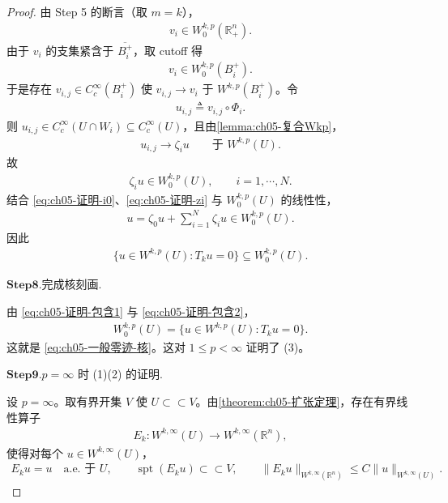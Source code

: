 \begin{proof}
由 Step 5 的断言（取 $m=k$），
\begin{align*}
v_{i}\in W^{k,p}_{0}(\mathbb{R}^{n}_{+}).
\end{align*}
由于 $v_{i}$ 的支集紧含于 $\overline{B_{i}^{+}}$，取 cutoff 得
\begin{align}
v_{i}\in W^{k,p}_{0}(B_{i}^{+}).
\label{eq:ch05-证明-vi}
\end{align}
于是存在 $v_{i,j}\in C^{\infty}_{c}(B_{i}^{+})$ 使 $v_{i,j}\to v_{i}$ 于 $W^{k,p}(B_{i}^{+})$。令
\begin{align*}
u_{i,j}\triangleq v_{i,j}\circ\Phi_{i}.
\end{align*}
则 $u_{i,j}\in C^{\infty}_{c}(U\cap W_{i})\subseteq C^{\infty}_{c}(U)$，且由\cref{lemma:ch05-复合Wkp}，
\begin{align*}
u_{i,j}\longrightarrow\zeta_{i}u
\qquad\text{于 }W^{k,p}(U).
\end{align*}
故
\begin{align}
\zeta_{i}u\in W^{k,p}_{0}(U),
\qquad i=1,\cdots,N.
\label{eq:ch05-证明-zi}
\end{align}
结合 \eqref{eq:ch05-证明-i0}、\eqref{eq:ch05-证明-zi} 与 $W^{k,p}_{0}(U)$ 的线性性，
\begin{align*}
u=\zeta_{0}u+\sum_{i=1}^{N}\zeta_{i}u\in W^{k,p}_{0}(U).
\end{align*}
因此
\begin{align}
\{u\in W^{k,p}(U):T_{k}u=0\}\subseteq W^{k,p}_{0}(U).
\label{eq:ch05-证明-包含2}
\end{align}

\noindent$\mathbf{Step}\mathbf{8}.${\heiti 完成核刻画.}

由 \eqref{eq:ch05-证明-包含1} 与 \eqref{eq:ch05-证明-包含2}，
\begin{align*}
W^{k,p}_{0}(U)=\{u\in W^{k,p}(U):T_{k}u=0\}.
\end{align*}
这就是 \eqref{eq:ch05-一般零迹-核}。这对 $1\leqslant p<\infty$ 证明了 (3)。

\noindent$\mathbf{Step}\mathbf{9}.${\heiti $p=\infty$ 时 (1)(2) 的证明.}

设 $p=\infty$。取有界开集 $V$ 使 $U\subset\subset V$。由\cref{theorem:ch05-扩张定理}，存在有界线性算子
\begin{align*}
E_{k}:W^{k,\infty}(U)\longrightarrow W^{k,\infty}(\mathbb{R}^{n}),
\end{align*}
使得对每个 $u\in W^{k,\infty}(U)$，
\begin{align*}
E_{k}u=u\quad\text{a.e. 于 }U,
\qquad
\operatorname{spt}(E_{k}u)\subset\subset V,
\qquad
\|E_{k}u\|_{W^{k,\infty}(\mathbb{R}^{n})}\leqslant C\|u\|_{W^{k,\infty}(U)}.
\end{align*}


\end{proof}
